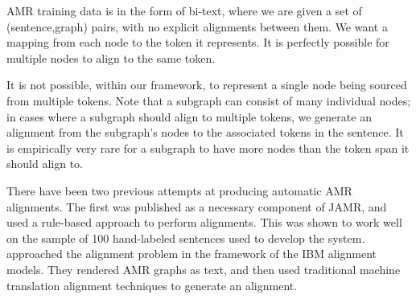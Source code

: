 
AMR training data is in the form of bi-text, where we are given a set of
  (sentence,graph) pairs, with no explicit alignments between them.
We want a mapping from each node to the token it represents. It is perfectly possible for multiple nodes to align to the same token. 

It is not possible, within our framework, to represent a single node being sourced from multiple tokens.
Note that a subgraph can consist of many individual nodes; in cases where a subgraph
  should align to multiple tokens, we generate an alignment from the subgraph's nodes
  to the associated tokens in the sentence.
It is empirically very rare for a subgraph to have more nodes than the token span
  it should align to.




There have been two previous attempts at producing automatic AMR alignments. 
The first was published as a necessary component of JAMR, 
  and used a rule-based approach to perform alignments.
This was shown to work well on the sample of 100 hand-labeled sentences used to 
  develop the system.
 approached the alignment problem in 
  the framework of the IBM alignment models.
They rendered AMR graphs as text, and then used traditional machine translation 
  alignment techniques to generate an alignment.

